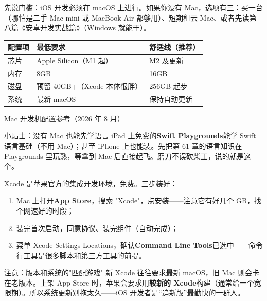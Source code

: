 


先说门槛：iOS 开发必须在 macOS 上进行。如果你没有 Mac，选项有三：买一台（哪怕是二手 Mac mini 或 MacBook Air 都够用）、短期租云 Mac、或者先读第八篇《安卓开发实战篇》（Windows 就能干）。

\begin{center}
\begin{tabularx}{\linewidth}{|X|X|X|}
\hline
\textbf{配置项} & \textbf{最低要求} & \textbf{舒适线（推荐）} \tabularnewline
\hline
芯片 & Apple Silicon（M1 起） & M2 及更新 \tabularnewline
内存 & 8GB & 16GB \tabularnewline
磁盘 & 预留 40GB+（Xcode 本体很胖） & 256GB 起步 \tabularnewline
系统 & 最新 macOS & 保持自动更新 \tabularnewline
\hline
\end{tabularx}
\end{center}

\begin{center}\small\color{gray}Mac 开发机配置参考（2026 年 8 月）\end{center}

\begin{tcbinfo}{小贴士：没有 Mac 也能先学语言}
iPad 上免费的\textbf{Swift Playgrounds}能学 Swift 语言基础（不用 Mac）；甚至 iPhone 上也能装。先把第 61 章的语言知识在 Playgrounds 里玩熟，等拿到 Mac 后直接起飞。磨刀不误砍柴工，说的就是这个。

\end{tcbinfo}


Xcode 是苹果官方的集成开发环境，免费。三步装好：

\begin{enumerate}
  \item Mac 上打开\textbf{App Store}，搜索 "Xcode"，点安装——注意它有好几个 GB，找个网速好的时段；
  \item 装完首次启动，同意协议、装完组件（自动完成）；
  \item 菜单 Xcode Settings Locations，确认\textbf{Command Line Tools}已选中——命令行工具是很多脚本和第三方工具的前提。
\end{enumerate}

\begin{tcbwarn}{注意：版本和系统的"匹配游戏"}
新 Xcode 往往要求最新 macOS，旧 Mac 则会卡在老版本。上架 App Store 时，苹果会要求用\textbf{较新的 Xcode}构建（通常给一个宽限期）。所以系统更新别拖太久——iOS 开发者是“追新版”最勤快的一群人。

\end{tcbwarn}

